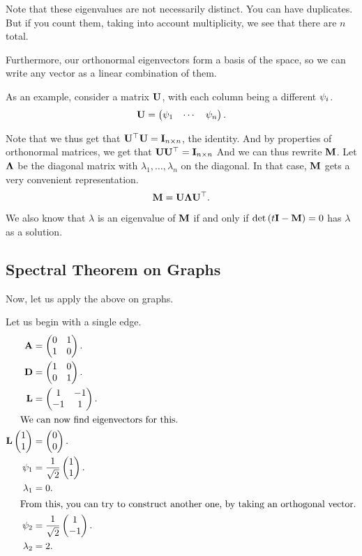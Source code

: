 \documentclass[11pt]{article}
\renewcommand\vec{\V}
\newcommand\itxt[1]{\intertext{\indent#1}}
\begin{document}
Note that these eigenvalues are not necessarily distinct.
You can have duplicates.
But if you count them, taking into account multiplicity,
we see that there are $n$ total.

Furthermore, our orthonormal eigenvectors form a basis of the space,
so we can write any vector as a linear combination of them.

As an example, consider a matrix $\V{U}$,
with each column being a different $\vec{\psi}_i$.
$$\V{U}=\colvec{\vec{\psi}_1&\cdots&\vec{\psi}_n}.$$

Note that we thus get that $\V{U}^{\top}\V{U}=\V{I}_{n\times n}$, the identity.
And by properties of orthonormal matrices,
we get that $\V{U}\V{U}^{\top}=\V{I}_{n\times n}$
And we can thus rewrite $\V{M}$.
Let $\V{\Lambda}$ be the diagonal matrix
with $\lambda_1,\ldots,\lambda_n$ on the diagonal.
In that case, $\V{M}$ gets a very convenient representation.
$$\V{M}=\V{U}\V{\Lambda}\V{U}^{\top}.$$

We also know that $\lambda$ is an eigenvalue of $\V{M}$
if and only if $\det\paren{t\V{I}-\V{M}}=0$ has $\lambda$ as a solution.


\subsection{Spectral Theorem on Graphs}
Now, let us apply the above on graphs.

Let us begin with a single edge.
\begin{align*}
\V{A}&=\colvec{0&1\\1&0}.\\
\V{D}&=\colvec{1&0\\0&1}.\\
\V{L}&=\colvec{1&-1\\-1&1}.\\
\itxt{We can now find eigenvectors for this.}
\V{L}\colvec{1\\1}&=\colvec{0\\0}.\\
\vec{\psi}_1&=\frac{1}{\sqrt{2}}\colvec{1\\1}.\\
\lambda_1&=0.\\
\itxt{From this, you can try to construct another one,
by taking an orthogonal vector.}
\vec{\psi}_2&=\frac{1}{\sqrt{2}}\colvec{1\\-1}.\\
\lambda_2&=2.
\end{align*}
\end{document}
